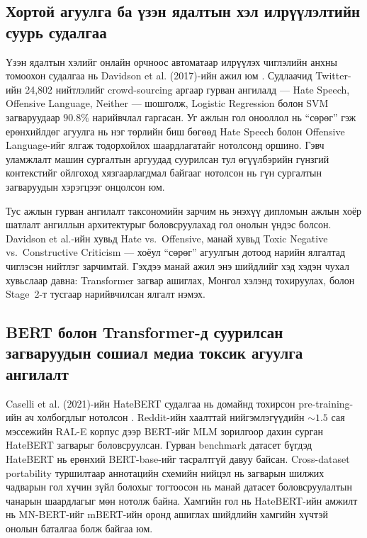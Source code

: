 \subsection{Хортой агуулга ба үзэн ядалтын хэл илрүүлэлтийн суурь судалгаа}

Үзэн ядалтын хэлийг онлайн орчноос автоматаар илрүүлэх чиглэлийн анхны
томоохон судалгаа нь Davidson et al. (2017)-ийн ажил юм \cite{davidson2017}.
Судлаачид Twitter-ийн 24,802 нийтлэлийг crowd-sourcing аргаар гурван ангилалд
--- Hate Speech, Offensive Language, Neither --- шошголж, Logistic Regression
болон SVM загваруудаар $90.8\%$ нарийвчлал гаргасан. Уг ажлын гол онооллол нь
``сөрөг'' гэж ерөнхийлдөг агуулга нь нэг төрлийн биш бөгөөд Hate Speech болон
Offensive Language-ийг ялгаж тодорхойлох шаардлагатайг нотолсонд оршино.
Гэвч уламжлалт машин сургалтын аргуудад суурилсан тул өгүүлбэрийн гүнзгий
контекстийг ойлгоход хязгаарлагдмал байгааг нотолсон нь гүн сургалтын
загваруудын хэрэгцээг онцолсон юм.

Тус ажлын гурван ангилалт таксономийн зарчим нь энэхүү дипломын ажлын хоёр
шатлалт ангиллын архитектурыг боловсруулахад гол онолын үндэс болсон.
Davidson et al.-ийн хувьд Hate vs.\ Offensive, манай хувьд Toxic Negative
vs.\ Constructive Criticism --- хоёул ``сөрөг'' агуулгын дотоод нарийн ялгалтад
чиглэсэн нийтлэг зарчимтай. Гэхдээ манай ажил энэ шийдлийг хэд хэдэн чухал
хувьслаар давна: Transformer загвар ашиглах, Монгол хэлэнд тохируулах, болон
Stage~2-т тусгаар нарийвчилсан ялгалт нэмэх.

\subsection{BERT болон Transformer-д суурилсан загваруудын сошиал медиа токсик
агуулга ангилалт}

Caselli et al. (2021)-ийн HateBERT судалгаа нь домайнд тохирсон pre-training-ийн
ач холбогдлыг нотолсон \cite{caselli2021}. Reddit-ийн хаалттай нийгэмлэгүүдийн
${\sim}1.5$ сая мэссежийн RAL-E корпус дээр BERT-ийг MLM зорилгоор дахин сурган
HateBERT загварыг боловсруулсан. Гурван benchmark датасет бүгдэд HateBERT нь
ерөнхий BERT-base-ийг тасралтгүй давуу байсан. Cross-dataset portability
туршилтаар аннотацийн схемийн нийцэл нь загварын шилжих чадварын гол хүчин
зүйл болохыг тогтоосон нь манай датасет боловсруулалтын чанарын шаардлагыг мөн
нотолж байна. Хамгийн гол нь HateBERT-ийн амжилт нь MN-BERT-ийг mBERT-ийн
оронд ашиглах шийдлийн хамгийн хүчтэй онолын баталгаа болж байгаа юм.

